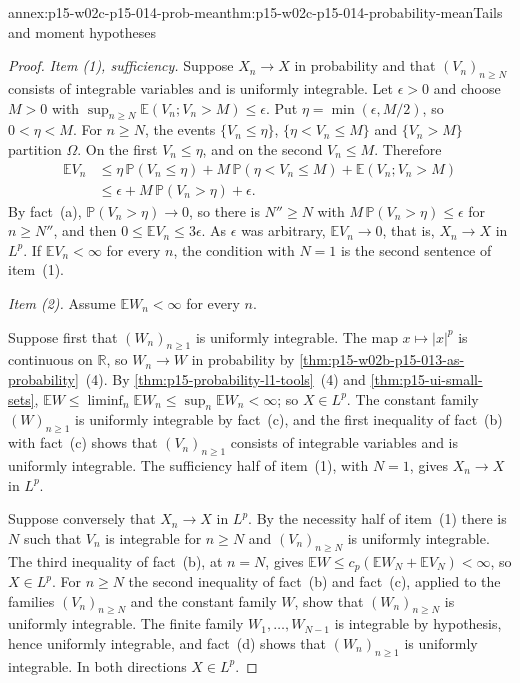 \begin{annexitem}{annex:p15-w02c-p15-014-prob-mean}{thm:p15-w02c-p15-014-probability-mean}{Tails and moment hypotheses}
\begin{proof}
\emph{Item (1), sufficiency.} Suppose \(X_n\to X\) in probability and
that \((V_n)_{n\geq N}\) consists of integrable variables and is
uniformly integrable. Let \(\epsilon>0\) and choose \(M>0\) with
\(\sup_{n\geq N}\mathbb E(V_n;V_n>M)\leq\epsilon\). Put
\(\eta=\min(\epsilon,M/2)\), so \(0<\eta<M\). For \(n\geq N\), the
events \(\{V_n\leq\eta\}\), \(\{\eta<V_n\leq M\}\) and \(\{V_n>M\}\)
partition \(\Omega\). On the first \(V_n\leq\eta\), and on the second
\(V_n\leq M\). Therefore
\[
 \begin{aligned}
 \mathbb EV_n&\leq\eta\,\mathbb P(V_n\leq\eta)
     +M\,\mathbb P(\eta<V_n\leq M)+\mathbb E(V_n;V_n>M)\\
 &\leq\epsilon+M\,\mathbb P(V_n>\eta)+\epsilon .
 \end{aligned}
\]
By fact~(a), \(\mathbb P(V_n>\eta)\to0\), so there is \(N''\geq N\) with
\(M\,\mathbb P(V_n>\eta)\leq\epsilon\) for \(n\geq N''\), and then
\(0\leq\mathbb EV_n\leq3\epsilon\). As \(\epsilon\) was arbitrary,
\(\mathbb EV_n\to0\), that is, \(X_n\to X\) in \(L^p\). If
\(\mathbb EV_n<\infty\) for every \(n\), the condition with \(N=1\) is
the second sentence of item~(1).

\emph{Item (2).} Assume \(\mathbb EW_n<\infty\) for every \(n\).

Suppose first that \((W_n)_{n\geq1}\) is uniformly integrable. The map
\(x\mapsto|x|^p\) is continuous on \(\mathbb R\), so
\(W_n\to W\) in probability by
\cref{thm:p15-w02b-p15-013-as-probability}~(4). By
\cref{thm:p15-probability-l1-tools}~(4) and
\cref{thm:p15-ui-small-sets},
\(\mathbb EW\leq\liminf_n\mathbb EW_n\leq\sup_n\mathbb EW_n<\infty\);
so \(X\in L^p\). The constant family \((W)_{n\geq1}\) is uniformly
integrable by fact~(c), and the first inequality of fact~(b) with
fact~(c) shows that \((V_n)_{n\geq1}\) consists of integrable variables
and is uniformly integrable. The sufficiency half of item~(1), with
\(N=1\), gives \(X_n\to X\) in \(L^p\).

Suppose conversely that \(X_n\to X\) in \(L^p\). By the necessity half
of item~(1) there is \(N\) such that \(V_n\) is integrable for
\(n\geq N\) and \((V_n)_{n\geq N}\) is uniformly integrable. The third
inequality of fact~(b), at \(n=N\), gives
\(\mathbb EW\leq c_p(\mathbb EW_N+\mathbb EV_N)<\infty\), so
\(X\in L^p\). For \(n\geq N\) the second inequality of fact~(b) and
fact~(c), applied to the families \((V_n)_{n\geq N}\) and the constant
family \(W\), show that \((W_n)_{n\geq N}\) is uniformly integrable. The
finite family \(W_1,\ldots,W_{N-1}\) is integrable by hypothesis, hence
uniformly integrable, and fact~(d) shows that \((W_n)_{n\geq1}\) is
uniformly integrable. In both directions \(X\in L^p\).


\end{proof}
\end{annexitem}
